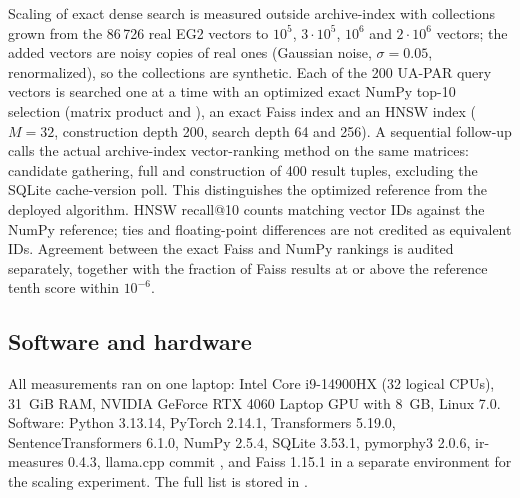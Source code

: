 Scaling of exact dense search is measured outside archive-index with collections grown from the 86\,726 real EG2 vectors to $10^5$, $3\cdot10^5$, $10^6$ and $2\cdot10^6$ vectors; the added vectors are noisy copies of real ones (Gaussian noise, $\sigma=0.05$, renormalized), so the collections are synthetic. Each of the 200 UA-PAR query vectors is searched one at a time with an optimized exact NumPy top-10 selection (matrix product and ), an exact Faiss index and an HNSW index ($M=32$, construction depth 200, search depth 64 and 256). A sequential follow-up calls the actual archive-index vector-ranking method on the same matrices: candidate gathering, full  and construction of 400 result tuples, excluding the SQLite cache-version poll. This distinguishes the optimized reference from the deployed algorithm. HNSW recall@10 counts matching vector IDs against the NumPy reference; ties and floating-point differences are not credited as equivalent IDs. Agreement between the exact Faiss and NumPy rankings is audited separately, together with the fraction of Faiss results at or above the reference tenth score within $10^{-6}$.

\subsection{Software and hardware}
All measurements ran on one laptop: Intel Core i9-14900HX (32 logical CPUs), 31~GiB RAM, NVIDIA GeForce RTX 4060 Laptop GPU with 8~GB, Linux 7.0. Software: Python 3.13.14, PyTorch 2.14.1, Transformers 5.19.0, SentenceTransformers 6.1.0, NumPy 2.5.4, SQLite 3.53.1, pymorphy3 2.0.6, ir-measures 0.4.3, llama.cpp commit , and Faiss 1.15.1 in a separate environment for the scaling experiment. The full list is stored in .
